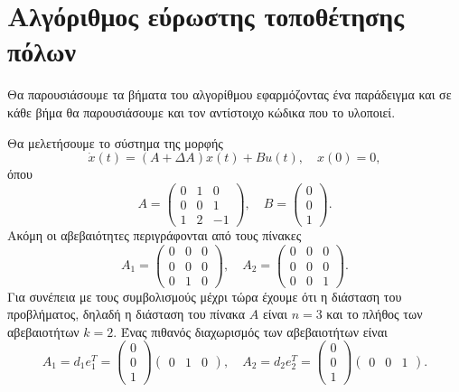 \section{Αλγόριθμος εύρωστης τοποθέτησης πόλων}
Θα παρουσιάσουμε τα βήματα του αλγορίθμου εφαρμόζοντας ένα παράδειγμα και σε
κάθε βήμα θα παρουσιάσουμε και τον αντίστοιχο κώδικα  που το
υλοποιεί.

Θα μελετήσουμε το σύστημα της μορφής
\[
    \dot{x}(t) = (A + \Delta A)x(t) + Bu(t), \quad x(0) = 0,
\]
όπου
\[
    A =
    \begin{pmatrix}
        0 & 1 & 0 \\
        0 & 0 & 1 \\
        1 & 2 & -1
    \end{pmatrix}, \quad
    B =
    \begin{pmatrix}
        0 \\
        0 \\
        1
    \end{pmatrix}.
\]
Ακόμη οι αβεβαιότητες περιγράφονται από τους πίνακες
\[
    A_1 =
    \begin{pmatrix}
        0 & 0 & 0 \\
        0 & 0 & 0 \\
        0 & 1 & 0
    \end{pmatrix}, \quad
    A_2 =
    \begin{pmatrix}
        0 & 0 & 0 \\
        0 & 0 & 0 \\
        0 & 0 & 1
    \end{pmatrix}.
\]
Για συνέπεια με τους συμβολισμούς μέχρι τώρα έχουμε ότι η διάσταση του
προβλήματος, δηλαδή η διάσταση του πίνακα \( A \) είναι \( n = 3 \) και το
πλήθος των αβεβαιοτήτων \( k = 2 \). Ένας πιθανός διαχωρισμός των αβεβαιοτήτων είναι
\[
    A_1 = d_1e_1^T =
    \begin{pmatrix}
        0 \\
        0 \\
        1
    \end{pmatrix}
    \begin{pmatrix}
        0 & 1 & 0
    \end{pmatrix}, \quad
    A_2 = d_2e_2^T =
    \begin{pmatrix}
        0 \\
        0 \\
        1
    \end{pmatrix}
    \begin{pmatrix}
        0 & 0 & 1
    \end{pmatrix}.
\]
